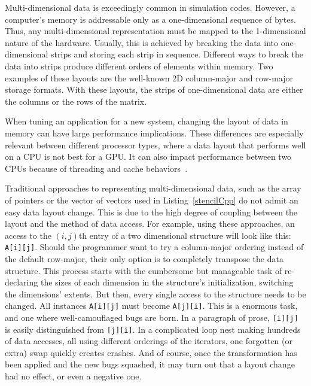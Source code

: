 Multi-dimensional data is exceedingly common in simulation codes.
However, a computer's memory is addressable only as a one-dimensional sequence of bytes.
Thus, any multi-dimensional representation must be mapped to the 1-dimensional nature of the hardware.
Usually, this is achieved by breaking the data into one-dimensional strips and storing each strip in sequence.
Different ways to break the data into strips produce different orders of elements within memory.
Two examples of these layouts are the well-known 2D column-major and row-major storage formats.
With these layouts, the strips of one-dimensional data are either the columns or the rows of the matrix.

When tuning an application for a new system, changing the layout of data in memory can have large performance implications.
These differences are especially relevant between different processor types, where a data layout that performs well on a CPU is not best for a GPU\@.
It can also impact performance between two CPUs because of threading and cache behaviors~\cite{trott2021kokkos}.

Traditional approaches to representing multi-dimensional data, such as the array of pointers or the vector of vectors used in Listing~\ref{stencilCpp} do not admit an easy data layout change.
This is due to the high degree of coupling between the layout and the method of data access. 
For example, using these approaches, an access to the $(i,j)$th entry of a two dimensional structure will look like this: \verb.A[i][j]..
Should the programmer want to try a column-major ordering instead of the default row-major, their only option is to completely transpose the data structure.
This process starts with the cumbersome but manageable task of re-declaring the sizes of each dimension in the structure's initialization, switching the dimensions' extents.
But then, every single access to the structure needs to be changed. 
All instances \verb.A[i][j]. must become \verb.A[j][i]..
This is a enormous task, and one where well-camouflaged bugs are born. 
In a paragraph of prose, \verb.[i][j]. is easily distinguished from \verb.[j][i]..
In a complicated loop nest making hundreds of data accesses, all using different orderings of the iterators, one forgotten (or extra) swap quickly creates crashes.
And of course, once the transformation has been applied and the new bugs squashed, it may turn out that a layout change had no effect, or even a negative one.

